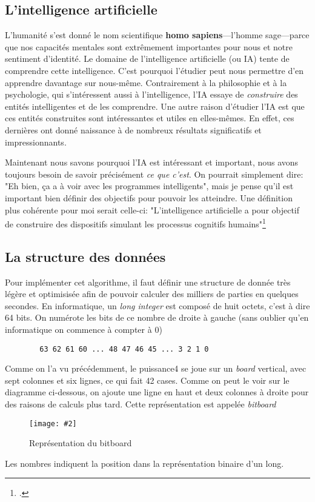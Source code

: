 \documentclass[a4paper]{article}
\newcommand{\img}[3][]{
    \begin{figure}[H]
        \centering
        \texttt{[image: \#2]}
        \caption{#1}    
    \end{figure}
}
\begin{document}
\subsection{L'intelligence artificielle}
    L'humanité s'est donné le nom scientifique \textbf{homo sapiens}---l'homme sage---parce que nos capacités mentales sont extrêmement importantes pour nous et notre sentiment d'identité. Le domaine de l'intelligence artificielle (ou IA) tente de comprendre cette intelligence. C'est pourquoi l'étudier peut nous permettre d'en apprendre davantage sur nous-même. Contrairement à la philosophie et à la psychologie, qui s'intéressent aussi à l'intelligence, l'IA essaye de \textit{construire} des entités intelligentes et de les comprendre. Une autre raison d'étudier l'IA est que ces entités construites sont intéressantes et utiles en elles-mêmes. En effet, ces dernières ont donné naissance à de nombreux résultats significatifs et impressionnants.

    Maintenant nous savons pourquoi l'IA est intéressant et important, nous avons toujours besoin de savoir précisément \textit{ce que c'est}. On pourrait simplement dire: "Eh bien, ça a à voir avec les programmes intelligents", mais je pense qu'il est important bien définir des objectifs pour pouvoir les atteindre. Une définition plus cohérente pour moi serait celle-ci: "L’intelligence artificielle a pour objectif de construire des dispositifs simulant les processus cognitifs humains"\footcite{haiech_2020}    


\subsection{La structure des données}
    Pour implémenter cet algorithme, il faut définir une structure de donnée très légère et optimisisée afin de pouvoir calculer des milliers de parties en quelques secondes. En informatique, un \textit{long integer} est composé de huit octets, c'est à dire 64 bits. On numérote les bits de ce nombre de droite à gauche (sans oublier qu'en informatique on commence à compter à 0)

    \begin{lstlisting}
        63 62 61 60 ... 48 47 46 45 ... 3 2 1 0
    \end{lstlisting}
    
    Comme on l'a vu précédemment, le puissance4 se joue sur un \textit{board} vertical, avec sept colonnes et six lignes, ce qui fait 42 cases. Comme on peut le voir sur le diagramme ci-dessous, on ajoute une ligne en haut et deux colonnes à droite pour des raisons de calculs plus tard. Cette représentation est appelée \textit{bitboard}
    \img[Représentation du bitboard]{Images/BitBoard.png}{0.7}
    Les nombres indiquent la position dans la représentation binaire d'un long.
\end{document}
